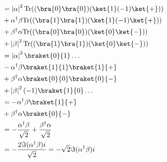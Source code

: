 \documentclass{article}
\newcommand{\trace}{{\rm Tr}}
\newcommand{\abs}[1]{\left\lvert #1 \right\rvert}
\begin{document}
\begin{enumerate}
\begin{enumerate}
$$\begin{aligned}
                                                              & = \abs{\alpha}^2\trace((\bra{0}\bra{0})(\ket{1}(-1)\ket{+}))                                                       \\
                                                              & + \alpha^\dagger\beta\trace((\bra{1}\bra{1})(\ket{1}(-1)\ket{+}))                                                  \\
                                                              & + \beta^\dagger\alpha\trace((\bra{0}\bra{0})(\ket{0}\ket{-}))                                                      \\
                                                              & + \abs{\beta}^2\trace((\bra{1}\bra{1})(\ket{0}\ket{-}))                                                            \\
                                                              & = \abs{\alpha}^2\braket{0}{1}\dots                                                                                 \\
                                                              & - \alpha^\dagger\beta\braket{1}{1}\braket{1}{+}                                                                    \\
                                                              & + \beta^\dagger\alpha\braket{0}{0}\braket{0}{-}                                                                    \\
                                                              & + \abs{\beta}^2(-1)\braket{1}{0}\dots                                                                              \\
                                                              & = - \alpha^\dagger\beta\braket{1}{+}                                                                               \\
                                                              & + \beta^\dagger\alpha\braket{0}{-}                                                                                 \\
                                                              & = - \frac{\alpha^\dagger\beta}{\sqrt{2}} + \frac{\beta^\dagger\alpha}{\sqrt{2}}                                    \\
                                                              & = - \frac{2\Im(\alpha^\dagger\beta)i}{\sqrt{2}}=-\sqrt{2}\Im(\alpha^\dagger\beta)i                                 \\
                  \end{aligned}$$


\end{enumerate}
\end{enumerate}
\end{document}

